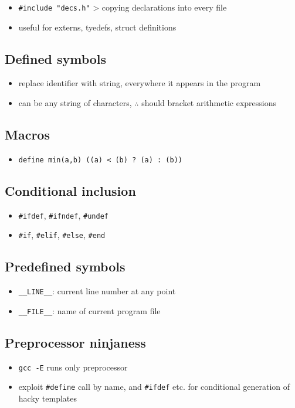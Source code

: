 \documentclass[10pt, multicolumn, a4paper]{article}
\begin{document}
\begin{multicols}{2}
	\begin{itemize}
	\item \verb|#include "decs.h"| > copying declarations into every file
	\item useful for externs, tyedefs, struct definitions
	\end{itemize}
	\subsection*{Defined symbols}
	\begin{itemize}
	\item replace identifier with string, everywhere it appears in the program
	\item can be any string of characters, $\therefore$ should bracket arithmetic expressions
	\end{itemize}
	\subsection*{Macros}
	\begin{itemize}
	\item \verb|define min(a,b) ((a) < (b) ? (a) : (b))|
	\end{itemize}
	\subsection*{Conditional inclusion}
	\begin{itemize}
	\item \verb|#ifdef|, \verb|#ifndef|, \verb|#undef|
	\item \verb|#if|, \verb|#elif|, \verb|#else|, \verb|#end|
	\end{itemize}
	\subsection*{Predefined symbols}
	\begin{itemize}
	\item \verb|__LINE__|: current line number at any point
	\item \verb|__FILE__|: name of current program file
	\end{itemize}
	\subsection*{Preprocessor ninjaness}
	\begin{itemize}
	\item \verb|gcc -E| runs only preprocessor
	\item exploit \verb|#define| call by name, and \verb|#ifdef| etc. for conditional generation of hacky templates
	\end{itemize}
	
\end{multicols}
\end{document}
